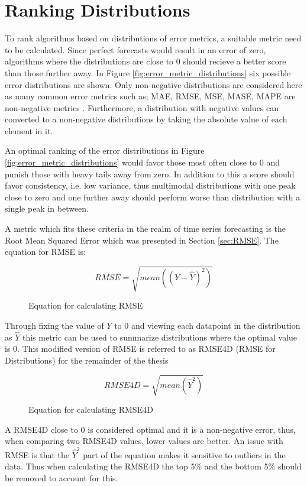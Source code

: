 \section{Ranking Distributions}
\label{sec:ranking_distributions}
To rank algorithms based on distributions of error metrics, a suitable metric need to be calculated. Since perfect forecasts would result in an error of zero, algorithms where the distributions are close to 0 should recieve a better score than those further away. In Figure \ref{fig:error_metric_distributions} six possible error distributions are shown. Only non-negative distributions are considered here as many common error metrics such as; MAE, RMSE, MSE, MASE, MAPE are non-negative metrics \cite{gluonts-github,hyndman_forecasting_3rd}. Furthermore, a distribution with negative values can converted to a non-negative distributions by taking the absolute value of each element in it.

An optimal ranking of the error distributions in Figure \ref{fig:error_metric_distributions} would favor those most often close to 0 and punish those with heavy tails away from zero. In addition to this a score should favor consistency, i.e. low variance, thus multimodal distributions with one peak close to zero and one further away should perform worse than distribution with a single peak in between.

A metric which fits these criteria in the realm of time series forecasting is the Root Mean Squared Error which was presented in Section \ref{sec:RMSE}. The equation for RMSE is:

\begin{figure}[h]
    \[RMSE = \sqrt{mean((Y - \hat{Y})^2)}\]
    \caption{Equation for calculating RMSE}
\end{figure}

Through fixing the value of \(Y\) to 0 and viewing each datapoint in the distribution as \(\hat{Y}\) this metric can be used to summarize distributions where the optimal value is 0. This modified version of RMSE is referred to as RMSE4D (RMSE for Distributions) for the remainder of the thesis

\begin{figure}[h]
    \[RMSE4D = \sqrt{mean(\hat{Y}^2)}\]
    \caption{Equation for calculating RMSE4D}
\end{figure}

A RMSE4D close to 0 is considered optimal and it is a non-negative error, thus, when comparing two RMSE4D values, lower values are better. An issue with RMSE is that the \(\hat{Y}^2\) part of the equation makes it sensitive to outliers in the data. Thus when calculating the RMSE4D the top 5\% and the bottom 5\% should be removed to account for this.

